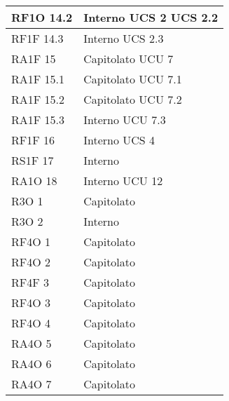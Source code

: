 \begin{center}
\begin{longtable}{ | p{5cm} | p{5cm} |}
        RF1O 14.2 &  Interno \newline  UCS 2 \newline  UCS 2.2 \newline  \\ \hline      
        RF1F 14.3 &  Interno \newline  UCS 2.3 \newline  \\ \hline      
        RA1F 15 &  Capitolato \newline  UCU 7 \newline  \\ \hline      
        RA1F 15.1 &  Capitolato \newline  UCU 7.1 \newline  \\ \hline      
        RA1F 15.2 &  Capitolato \newline  UCU 7.2 \newline  \\ \hline      
        RA1F 15.3 &  Interno \newline  UCU 7.3 \newline  \\ \hline      
        RF1F 16 &  Interno \newline  UCS 4 \newline  \\ \hline      
        RS1F 17 &  Interno \newline  \\ \hline      
        RA1O 18 &  Interno \newline  UCU 12 \newline  \\ \hline      
        R3O 1 &  Capitolato \newline  \\ \hline      
        R3O 2 &  Interno \newline  \\ \hline      
        RF4O 1 &  Capitolato \newline  \\ \hline      
        RF4O 2 &  Capitolato \newline  \\ \hline      
        RF4F 3 &  Capitolato \newline  \\ \hline      
        RF4O 3 &  Capitolato \newline  \\ \hline      
        RF4O 4 &  Capitolato \newline  \\ \hline      
        RA4O 5 &  Capitolato \newline  \\ \hline      
        RA4O 6 &  Capitolato \newline  \\ \hline      
        RA4O 7 &  Capitolato \newline  \\ \hline     
      \end{longtable}
      \egroup
      \end{center}  
\clearpage

